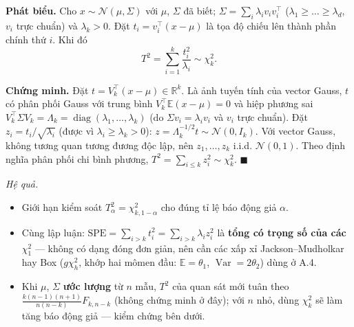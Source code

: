 \textbf{Phát biểu.} Cho \(x\sim\mathcal N(\mu,\Sigma)\) với \(\mu\), \(\Sigma\) đã biết; \(\Sigma=\sum_i\lambda_iv_iv_i^\top\) (\(\lambda_1\ge\dots\ge\lambda_d\), \(v_i\) trực chuẩn) và \(\lambda_k>0\). Đặt \(t_i=v_i^\top(x-\mu)\) là tọa độ chiếu lên thành phần chính thứ \(i\). Khi đó \[T^2=\sum_{i=1}^k\frac{t_i^2}{\lambda_i}\sim\chi^2_k .\]

\textbf{Chứng minh.} Đặt \(t=V_k^\top(x-\mu)\in\mathbb R^k\). Là ảnh tuyến tính của vector Gauss, \(t\) có phân phối Gauss với trung bình \(V_k^\top\mathbb E(x-\mu)=0\) và hiệp phương sai \(V_k^\top\Sigma V_k=\Lambda_k=\operatorname{diag}(\lambda_1,\dots,\lambda_k)\) (do \(\Sigma v_i=\lambda_iv_i\) và \(v_i\) trực chuẩn). Đặt \(z_i=t_i/\sqrt{\lambda_i}\) (được vì \(\lambda_i\ge\lambda_k>0\)): \(z=\Lambda_k^{-1/2}t\sim\mathcal N(0,I_k)\). Với vector Gauss, không tương quan tương đương độc lập, nên \(z_1,\dots,z_k\) i.i.d. \(\mathcal N(0,1)\). Theo định nghĩa phân phối chi bình phương, \(T^2=\sum_{i\le k}z_i^2\sim\chi^2_k\). \(\blacksquare\)

\emph{Hệ quả.}

\begin{itemize}

\item
  Giới hạn kiểm soát \(T^2_\alpha=\chi^2_{k,1-\alpha}\) cho đúng tỉ lệ báo động giả \(\alpha\).
\item
  Cùng lập luận: \(\mathrm{SPE}=\sum_{i>k}t_i^2=\sum_{i>k}\lambda_iz_i^2\) là \textbf{tổng có trọng số của các \(\chi^2_1\)} --- không có dạng đóng đơn giản, nên cần các xấp xỉ Jackson--Mudholkar hay Box (\(g\chi^2_h\), khớp hai mômen đầu: \(\mathbb E=\theta_1\), \(\operatorname{Var}=2\theta_2\)) dùng ở A.4.
\item
  Khi \(\mu\), \(\Sigma\) \textbf{ước lượng} từ \(n\) mẫu, \(T^2\) của quan sát mới tuân theo \(\frac{k(n-1)(n+1)}{n(n-k)}F_{k,n-k}\) (không chứng minh ở đây); với \(n\) nhỏ, dùng \(\chi^2_k\) sẽ làm tăng báo động giả --- kiểm chứng bên dưới.
\end{itemize}
